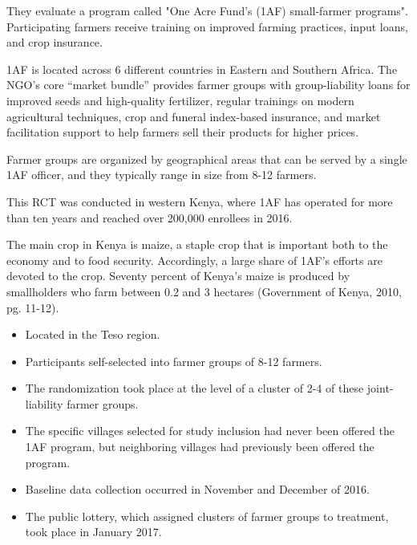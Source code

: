 \documentclass[12pt,letterpaper]{article}
\begin{document}
\noindent They evaluate a program called "One Acre Fund's (1AF) small-farmer programs". Participating farmers receive training on improved farming practices, input loans, and crop insurance.

\noindent 1AF is located across 6 different countries in Eastern and Southern Africa. The NGO’s core “market bundle” provides farmer groups with group-liability loans for improved seeds and high-quality fertilizer, regular trainings on modern agricultural techniques, crop and funeral index-based insurance, and market facilitation support to help farmers sell their products for higher prices.

\noindent Farmer groups are organized by geographical areas that can be served by a single 1AF officer, and they typically range in size from 8-12 farmers.

\noindent This RCT was conducted in western Kenya, where 1AF has operated for more than ten years and reached over 200,000 enrollees in 2016.

\noindent The main crop in Kenya is maize, a staple crop that is important both to the economy and to food security. Accordingly, a large share of 1AF’s efforts are devoted to the crop. Seventy percent of Kenya’s maize is produced by smallholders who farm between 0.2 and 3 hectares (Government of Kenya, 2010, pg. 11-12).

\begin{itemize}
  \item Located in the Teso region.
  \item Participants self-selected into farmer groups of 8-12 farmers.
  \item The randomization took place at the level of a cluster of 2-4 of these joint-liability farmer groups.
  \item The specific villages selected for study inclusion had never been offered the 1AF program, but neighboring villages had previously been offered the program.
  \item Baseline data collection occurred in November and December of 2016.
  \item The public lottery, which assigned clusters of farmer groups to treatment, took place in January 2017. 
\end{itemize}
\end{document}
